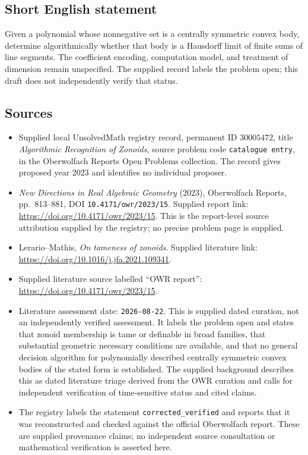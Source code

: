 \documentclass[11pt]{article}
\begin{document}
\subsection{Short English statement}
Given a polynomial whose nonnegative set is a centrally symmetric convex body, determine algorithmically whether that body is a Hausdorff limit of finite sums of line segments. The coefficient encoding, computation model, and treatment of dimension remain unspecified. The supplied record labels the problem open; this draft does not independently verify that status.
\subsection{Sources}
\begin{itemize}
\item Supplied local UnsolvedMath registry record, permanent ID \(30005472\), title \emph{Algorithmic Recognition of Zonoids}, source problem code \texttt{catalogue entry}, in the Oberwolfach Reports Open Problems collection. The record gives proposed year 2023 and identifies no individual proposer.
\item \emph{New Directions in Real Algebraic Geometry} (2023), Oberwolfach Reports, pp.\ 813--881, DOI \texttt{10.4171/owr/2023/15}. Supplied report link: \url{https://doi.org/10.4171/owr/2023/15}. This is the report-level source attribution supplied by the registry; no precise problem page is supplied.
\item Lerario--Mathis, \emph{On tameness of zonoids}. Supplied literature link: \url{https://doi.org/10.1016/j.jfa.2021.109341}.
\item Supplied literature source labelled ``OWR report'': \url{https://doi.org/10.4171/owr/2023/15}.
\item Literature assessment date: \texttt{2026-08-22}. This is supplied dated curation, not an independently verified assessment. It labels the problem open and states that zonoid membership is tame or definable in broad families, that substantial geometric necessary conditions are available, and that no general decision algorithm for polynomially described centrally symmetric convex bodies of the stated form is established. The supplied background describes this as dated literature triage derived from the OWR curation and calls for independent verification of time-sensitive status and cited claims.
\item The registry labels the statement \texttt{corrected\_verified} and reports that it was reconstructed and checked against the official Oberwolfach report. These are supplied provenance claims; no independent source consultation or mathematical verification is asserted here.
\end{itemize}
\end{document}
